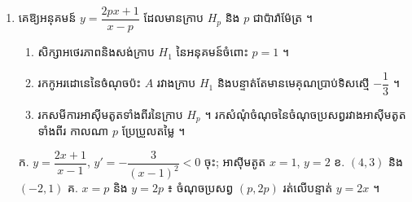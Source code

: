 \begin{enumerate}[1]
  \item គេឱ្យអនុគមន៍ $y = \dfrac{2px + 1}{x - p}$ ដែលមានក្រាប $H_p$ និង $p$ ជាប៉ារ៉ាម៉ែត្រ ។
  \begin{enumerate}[a]
    \item សិក្សាអថេរភាពនិងសង់ក្រាប $H_1$ នៃអនុគមន៍ចំពោះ $p = 1$ ។
    \item រកកូអរដោនេនៃចំណុចប៉ះ $A$ រវាងក្រាប $H_1$ និងបន្ទាត់តែមានមេគុណប្រាប់ទិសស្មើ $-\dfrac{1}{3}$ ។
    \item រកសមីការអាស៊ីមតូតទាំងពីរនៃក្រាប $H_p$ ។ រកសំណុំចំណុចនៃចំណុចប្រសព្វរវាងអាស៊ីមតូតទាំងពីរ កាលណា $p$ ប្រែប្រួលតម្លៃ ។
  \end{enumerate}
  \ans
  ក. $y = \dfrac{2x + 1}{x - 1}$, $y' = -\dfrac{3}{(x - 1)^2} < 0$ ចុះ; អាស៊ីមតូត $x = 1$, $y = 2$ \quad ខ. $(4, 3)$ និង $(-2, 1)$ \quad គ. $x = p$ និង $y = 2p$ ៖ ចំណុចប្រសព្វ $(p, 2p)$ រត់លើបន្ទាត់ $y = 2x$ ។
\end{enumerate}

